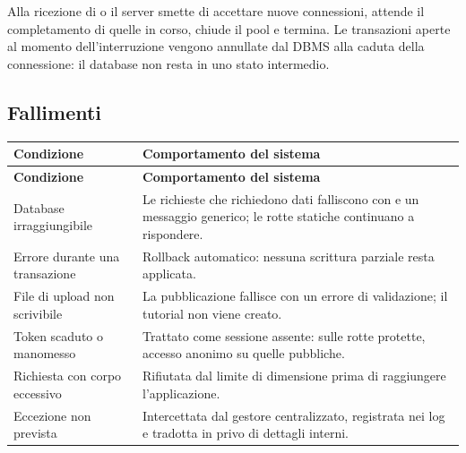 Alla ricezione di  o  il server smette di accettare
nuove connessioni, attende il completamento di quelle in corso, chiude il
pool e termina. Le transazioni aperte al momento dell'interruzione vengono
annullate dal DBMS alla caduta della connessione: il database non resta in
uno stato intermedio.

\subsection{Fallimenti}

\begin{longtable}{@{}L{4.6cm} L{9.8cm}@{}}
\toprule
\textbf{Condizione} & \textbf{Comportamento del sistema} \\
\midrule
\endfirsthead
\toprule
\textbf{Condizione} & \textbf{Comportamento del sistema} \\
\midrule
\endhead
\bottomrule
\endlastfoot

Database irraggiungibile &
Le richieste che richiedono dati falliscono con  e un messaggio
generico; le rotte statiche continuano a rispondere. \\

Errore durante una transazione &
Rollback automatico: nessuna scrittura parziale resta applicata. \\

File di upload non scrivibile &
La pubblicazione fallisce con un errore di validazione; il tutorial non viene
creato. \\

Token scaduto o manomesso &
Trattato come sessione assente:  sulle rotte protette, accesso
anonimo su quelle pubbliche. \\

Richiesta con corpo eccessivo &
Rifiutata dal limite di dimensione prima di raggiungere l'applicazione. \\

Eccezione non prevista &
Intercettata dal gestore centralizzato, registrata nei log e tradotta in
 privo di dettagli interni. \\

\end{longtable}
